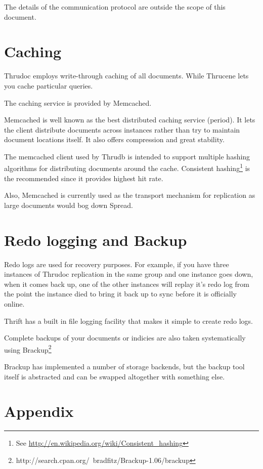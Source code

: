 \documentclass[nocopyrightspace,blockstyle]{sigplanconf}
\begin{document}
The details of the communication protocol are outside the scope of this document. 

\section{Caching}

Thrudoc employs write-through caching of all documents. While Thrucene lets you cache particular queries.

The caching service is provided by Memcached.  

Memcached is well known as the best distributed caching service (period).  
It lets the client distribute documents across instances rather than try to maintain document locations itself. 
It also offers compression and great stability.
   
The memcached client used by Thrudb is intended to support multiple hashing algorithms for distributing documents around the cache.
Consistent hashing\footnote{See \url{http://en.wikipedia.org/wiki/Consistent_hashing}} is the recommended since it provides highest hit rate. 

Also, Memcached is currently used as the transport mechanism for replication as large documents would bog down Spread.

\section{Redo logging and Backup}

Redo logs are used for recovery purposes.  
For example, if you have three instances of Thrudoc replication in the same group and one instance goes down, when it comes back up, 
one of the other instances will replay it's redo log from the point the instance died to bring it back up to sync before it is
officially online.
  
Thrift has a built in file logging facility that makes it simple to create redo logs.

Complete backups of your documents or indicies are also taken systematically using Brackup\footnote{http://search.cpan.org/~bradfitz/Brackup-1.06/brackup}

Brackup has implemented a number of storage backends, but the backup tool itself is abstracted and can be swapped altogether with something else. 

\section{Appendix}
\end{document}
